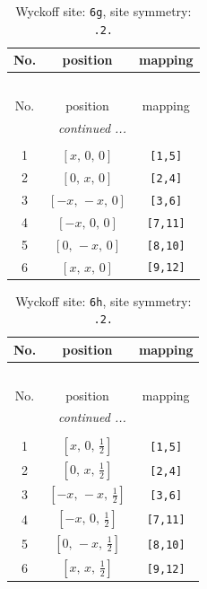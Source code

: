 \documentclass[fleqn,8pt]{jsarticle}
\begin{document}
\begin{longtable}{ccc}
\caption{Wyckoff site: {\tt 6g}, site symmetry: {\tt .2.}}
 \\
 \hline \hline
No. & position & mapping \\ \hline \endfirsthead

\multicolumn{2}{l}{\tablename\ \thetable{}} \\
 \hline \hline
No. & position & mapping \\ \hline \endhead

 \hline \hline
\multicolumn{2}{r}{\footnotesize\it continued ...} \\ \endfoot

 \hline \hline
\multicolumn{2}{r}{} \\ \endlastfoot

1 & $\left[ x,\, 0,\, 0 \right]$ & {\tt [1,5]} \\ \hline
2 & $\left[ 0,\, x,\, 0 \right]$ & {\tt [2,4]} \\ \hline
3 & $\left[ - x,\, - x,\, 0 \right]$ & {\tt [3,6]} \\ \hline
4 & $\left[ - x,\, 0,\, 0 \right]$ & {\tt [7,11]} \\ \hline
5 & $\left[ 0,\, - x,\, 0 \right]$ & {\tt [8,10]} \\ \hline
6 & $\left[ x,\, x,\, 0 \right]$ & {\tt [9,12]} \\
\end{longtable}
\renewcommand{\arraystretch}{1.2}
\begin{longtable}{ccc}
\caption{Wyckoff site: {\tt 6h}, site symmetry: {\tt .2.}}
 \\
 \hline \hline
No. & position & mapping \\ \hline \endfirsthead

\multicolumn{2}{l}{\tablename\ \thetable{}} \\
 \hline \hline
No. & position & mapping \\ \hline \endhead

 \hline \hline
\multicolumn{2}{r}{\footnotesize\it continued ...} \\ \endfoot

 \hline \hline
\multicolumn{2}{r}{} \\ \endlastfoot

1 & $\left[ x,\, 0,\, \frac{1}{2} \right]$ & {\tt [1,5]} \\ \hline
2 & $\left[ 0,\, x,\, \frac{1}{2} \right]$ & {\tt [2,4]} \\ \hline
3 & $\left[ - x,\, - x,\, \frac{1}{2} \right]$ & {\tt [3,6]} \\ \hline
4 & $\left[ - x,\, 0,\, \frac{1}{2} \right]$ & {\tt [7,11]} \\ \hline
5 & $\left[ 0,\, - x,\, \frac{1}{2} \right]$ & {\tt [8,10]} \\ \hline
6 & $\left[ x,\, x,\, \frac{1}{2} \right]$ & {\tt [9,12]} \\
\end{longtable}
\end{document}
